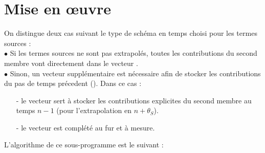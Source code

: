 \section*{Mise en \oe uvre}
On distingue deux cas suivant le type de sch\'{e}ma en temps choisi pour les termes sources :
\\
$\bullet$ Si les termes sources ne sont pas extrapol\'{e}s, toutes les contributions
du second membre vont directement dans le vecteur
.\\
$\bullet$ Sinon, un vecteur suppl\'{e}mentaire est n\'{e}cessaire afin de stocker les
contributions du pas de temps pr\'{e}cedent (). Dans ce cas :
\begin{itemize}
\item [-] le vecteur  sert \`{a} stocker les contributions explicites du
second membre au temps $n-1$ (pour l'extrapolation en $n+\theta_S$).
\item [-] le vecteur  est compl\'{e}t\'{e} au fur et \`{a} mesure.
\\
\end{itemize}
L'algorithme de ce sous-programme est le suivant :
